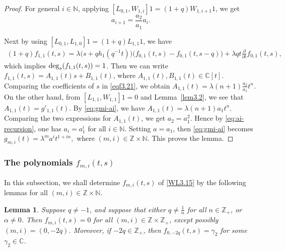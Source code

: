 \documentclass[a4paper]{amsart}
\numberwithin{equation}{section}
\newtheorem{lemma}[theorem]{Lemma}
\begin{document}
\begin{proof}
For general $i\in\mathbb N$, applying
$[L_{0,1},W_{1,i}]1=(1+q)W_{1,i+1}1$, we get
\begin{equation}\label{eq:ai-recursion}
a_{i+1}=\frac{a_2}{a_1}a_i.
\end{equation}

Next by using
$[L_{0,1},L_{1,0}]1=(1+q)L_{1,1}1$, we have 
\begin{align}\label{eqf3.21}
    (1+q)f_{1,1}(t,s)=\lambda\big(s+qh_1(q^{-1}t)\big)\big(f_{0,1}(t,s)-f_{0,1}(t,s-q)\big)+\lambda qt\frac{\partial}{\partial t}f_{0,1}(t,s),
    \end{align}
which implies ${\rm deg}_s(f_{1,1}(t,s))=1$. Then we can write 
$f_{1,1}(t,s)=A_{1,1}(t)s+B_{1,1}(t)$, where $A_{1,1}(t), B_{1,1}(t)\in\mathbb{C}[t]$.
  Comparing the coefficients of $s$ in \eqref{eqf3.21}, we obtain
$
A_{1,1}(t)
=
\lambda(n+1)\frac{a_2}{a_1}t^n.
$
On the other hand, from
$[L_{1,1},W_{1,1}]1=0$
  and   Lemma~\ref{lem3.2}, we see that  
$
A_{1,1}(t)=g'_{1,1}(t).
$
By \eqref{eq:gmi-ai},
we have
$
A_{1,1}(t)=\lambda(n+1)a_1t^n.
$
Comparing the two expressions for $A_{1,1}(t)$, we get
$
a_2=a_1^2.
$
Hence by \eqref{eq:ai-recursion}, one has  $a_i=a_1^i$ for all $i\in\mathbb N$. Setting $a=a_1$, then \eqref{eq:gmi-ai} becomes   
$
g_{m,i}(t)=\lambda^m a^i t^{1+in},$ where $ (m,i)\in\mathbb Z\times\mathbb N.
$
This proves the lemma.
\end{proof}

\subsubsection{The polynomials $f_{m,i}(t,s)$}
In this subsection, we shall determine $f_{m,i}(t,s)$  of \eqref{WL3.15} by the following lemmas for all $(m,i)\in\mathbb{Z}\times\mathbb{N}$.

\begin{lemma}\label{lem:ordinary-L-vanishing}
Suppose $q\neq -1$, and suppose that either
$q\neq \frac1n$ for all $n\in\mathbb Z_+$, or $\alpha\neq0$.
 Then
$
f_{m,i}(t,s)=0
$
for all $(m,i)\in\mathbb Z\times\mathbb Z_+$, except possibly
$(m,i)=(0,-2q)$. Moreover, if $-2q\in\mathbb Z_+$, then
$
f_{0,-2q}(t,s)=\gamma_2
$
for some $\gamma_2\in\mathbb C$.
\end{lemma}
\end{document}
